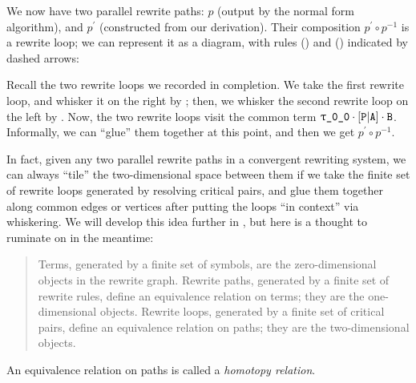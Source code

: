 \documentclass[../generics]{subfiles}
\begin{document}
\begin{example}
We now have two parallel rewrite paths: $p$ (output by the normal form algorithm), and $p^\prime$ (constructed from our derivation). Their composition $p^\prime\circ p^{-1}$ is a rewrite loop; we can represent it as a diagram, with rules () and () indicated by dashed arrows:
\begin{center}
\end{center}
Recall the two rewrite loops we recorded in completion. We take the first rewrite loop, and whisker it on the right by \nB; then, we whisker the second rewrite loop on the left by \rT. Now, the two rewrite loops visit the common term $\rT\cdot\aPA\cdot\nB$. Informally, we can ``glue'' them together at this point, and then we get $p^\prime\circ p^{-1}$.

In fact, given any two parallel rewrite paths in a convergent rewriting system, we can always ``tile'' the two-dimensional space between them if we take the finite set of rewrite loops generated by resolving critical pairs, and glue them together along common edges or vertices after putting the loops ``in context'' via whiskering. We will develop this idea further in , but here is a thought to ruminate on in the meantime:
\begin{quote}
Terms, generated by a finite set of symbols, are the zero-dimensional objects in the rewrite graph. Rewrite paths, generated by a finite set of rewrite rules, define an equivalence relation on terms; they are the one-dimensional objects. Rewrite loops, generated by a finite set of critical pairs, define an equivalence relation on paths; they are the two-dimensional objects.
\end{quote}
An equivalence relation on paths is called a \emph{homotopy relation}.
\end{example}
\end{document}

